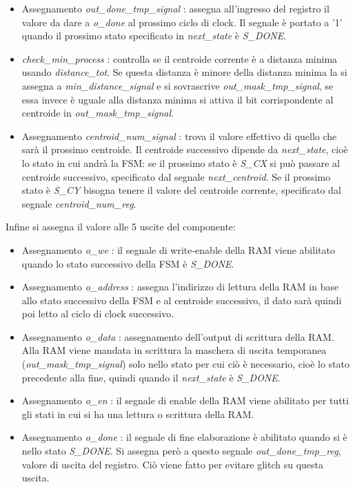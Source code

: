 \documentclass{article}
\begin{document}
\begin{itemize}
    \item Assegnamento \textit{out\_done\_tmp\_signal} : assegna all'ingresso del registro il valore da dare a \textit{o\_done} al prossimo ciclo di clock. Il segnale è portato a '1' quando il prossimo stato specificato in \textit{next\_state} è \textit{S\_DONE}.
    \item \textit{check\_min\_process} : controlla se il centroide corrente è a distanza minima usando \textit{distance\_tot}. Se questa distanza è minore della distanza minima la si assegna a \textit{min\_distance\_signal} e si sovrascrive \textit{out\_mask\_tmp\_signal}, se essa invece è uguale alla distanza minima si attiva il bit corrispondente al centroide in \textit{out\_mask\_tmp\_signal}.
    \item Assegnamento \textit{centroid\_num\_signal} : trova il valore effettivo di quello che sarà il prossimo centroide. Il centroide successivo dipende da \textit{next\_state}, cioè lo stato in cui andrà la FSM: se il prossimo stato è \textit{S\_CX} si può passare al centroide successivo, specificato dal segnale \textit{next\_centroid}. Se il prossimo stato è \textit{S\_CY} bisogna tenere il valore del centroide corrente, specificato dal segnale \textit{centroid\_num\_reg}.
\end{itemize}
Infine si assegna il valore alle 5 uscite del componente:
\begin{itemize}
    \item Assegnamento \textit{o\_we} : il segnale di write-enable della RAM viene abilitato quando lo stato successivo della FSM è \textit{S\_DONE}.
    \item Assegnamento \textit{o\_address} : assegna l'indirizzo di lettura della RAM in base allo stato successivo della FSM e al centroide successivo, il dato sarà quindi poi letto al ciclo di clock successivo.
    \item Assegnamento \textit{o\_data} : assegnamento dell'output di scrittura della RAM. Alla RAM viene mandata in scrittura la maschera di uscita temporanea (\textit{out\_mask\_tmp\_signal}) solo nello stato per cui ciò è necessario, cioè lo stato precedente alla fine, quindi quando il \textit{next\_state} è \textit{S\_DONE}.
    \item Assegnamento \textit{o\_en} : il segnale di enable della RAM viene abilitato per tutti gli stati in cui si ha una lettura o scrittura della RAM.
    \item Assegnamento \textit{o\_done} : il segnale di fine elaborazione è abilitato quando si è nello stato \textit{S\_DONE}. Si assegna però a questo segnale \textit{out\_done\_tmp\_reg}, valore di uscita del registro. Ciò viene fatto per evitare glitch su questa uscita.
\end{itemize}
\end{document}

